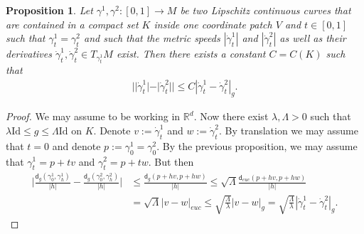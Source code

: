 \documentclass[a4paper,10pt]{article}
\newtheorem{proposition}[theorem]{Proposition}
\numberwithin{equation}{section}
\newcommand{\R}{\mathbb{R}}
\newcommand{\sfd}{\mathsf d}
\begin{document}
 \begin{proposition}\label{metric_speed_continuous_from_direction}
     Let $\gamma^1, \gamma^2 :[0,1] \to M$ be two Lipschitz continuous curves that are contained in a compact set $K$ inside one coordinate patch $V$ and $t \in [0,1]$ such that $\gamma^1_t = \gamma^2_t$ and such that the metric speeds $|\dot{\gamma}^1_t|$ and $|\dot{\gamma}^2_t|$ as well as their derivatives $\dot{\gamma}^1_t,\dot{\gamma}^2_t\in T_{\gamma^1_t}M$ exist. Then there exists a constant $C =C(K)$ such that 
     \begin{align}
         ||\dot{\gamma}^1_t|-|\dot{\gamma}^2_t|| \leq C|\dot{\gamma}^1_t-\dot{\gamma}^2_t|_g.
     \end{align}
 \end{proposition}
 \begin{proof}
     We may assume to be working in $\R^d$. Now there exist $\lambda, \Lambda >0$ such that $\lambda \mathrm{Id} \leq g \leq \Lambda \mathrm{Id}$ on $K$. 
     Denote $v := \dot{\gamma}^1_t$ and $w := \dot{\gamma}^2_t$. By translation we may assume that $t=0$ and denote $p:=\gamma^1_0 = \gamma^2_0$. 
     By the previous proposition, we may assume that $\gamma^1_t = p+tv$ and $\gamma^2_t = p+tw$. But then 
     \begin{align*}
         \Big|\frac{\sfd_g(\gamma^1_0, \gamma^1_h)}{|h|} -\frac{\sfd_g(\gamma^2_0, \gamma^2_h)}{|h|}\Big| &\leq \frac{\sfd_g(p+hv, p+hw)}{|h|} \leq \sqrt{\Lambda} \frac{\sfd_{euc}(p+hv,p+hw)}{|h|} \\
         &= \sqrt{\Lambda}|v-w|_{euc} \leq \sqrt{\frac{\Lambda}{\lambda}}|v-w|_g = \sqrt{\frac{\Lambda}{\lambda}} |\dot{\gamma}^1_t-\dot{\gamma}^2_t|_g.
     \end{align*}
 \end{proof}
\end{document}
